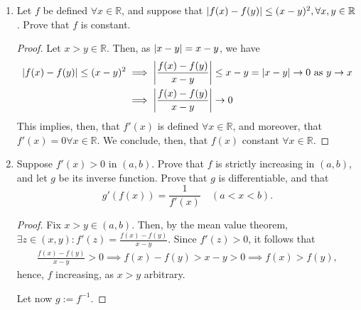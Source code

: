 \begin{example}
    \begin{enumerate}
        \item Let $f$ be defined $\forall x \in \mathbb{R}$, and suppose that $\abs{f(x) - f(y)} \leq (x - y)^2, \forall x, y \in \mathbb{R}$. Prove that $f$ is constant.\footnotemark
        \begin{proof}
            Let $x > y \in \mathbb{R}$. Then, as $\abs{x - y} = x - y$, we have \begin{align*}
                \abs{f(x) - f(y)} \leq (x - y)^2 &\implies \abs{\frac{f(x) - f(y)}{x - y}} \leq x - y = \abs{x - y} \to 0 \text{ as } y \to x\\
                &\implies \abs{\frac{f(x) - f(y)}{x - y}} \to 0
            \end{align*}
            This implies, then, that $f'(x)$ is defined $\forall x \in \mathbb{R}$, and moreover, that $f'(x) = 0 \forall x \in \mathbb{R}$. We conclude, then, that $f(x)$ constant $\forall x \in \mathbb{R}$.
        \end{proof}
    
        \item Suppose $f'(x) > 0$ in $(a, b)$. Prove that $f$ is strictly increasing in $(a, b)$, and let $g$ be its inverse function. Prove that $g$ is differentiable, and that \[
        g'(f(x)) = \frac{1}{f'(x)}   \quad (a < x < b).
        \]
        \begin{proof}
            Fix $x > y \in (a, b)$. Then, by the mean value theorem, $\exists z \in (x, y) : f'(z) = \frac{f(x) - f(y)}{x - y}$. Since $f'(z) > 0$, it follows that \begin{align*}
                \frac{f(x) - f(y)}{x - y} > 0 \implies f(x) - f(y) > x - y > 0 \implies f(x) > f(y),
            \end{align*}
            hence, $f$ increasing, as $x > y$ arbitrary.

            Let now $g := f^{-1}$.
        \end{proof}
    \end{enumerate}
\end{example}



